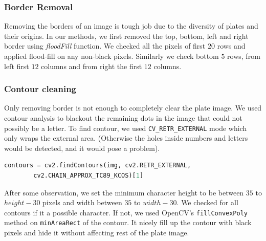 \documentclass{standalone}
\begin{document}
\subsubsection{Border Removal}
Removing the borders of an image is tough job due to the diversity of plates and their origins. In our methods, we first removed the top, bottom, left and right border using {\it floodFill} function. We checked all the pixels of first $20$ rows and applied flood-fill on any non-black pixels. Similarly we check bottom $5$ rows, from left first $12$ columns and from right the first $12$ columns.

\subsubsection{Contour cleaning}
Only removing border is not enough to completely clear the plate image. We used contour analysis to blackout the remaining dots in the image that could not possibly be a letter.
To find contour, we used \texttt{CV\_RETR\_EXTERNAL} mode which only wraps the external area. (Otherwise the holes inside numbers and letters would be detected, and it would pose a problem).
\begin{lstlisting}[language=Python]
    contours = cv2.findContours(img, cv2.RETR_EXTERNAL,
        cv2.CHAIN_APPROX_TC89_KCOS)[1]
\end{lstlisting}

After some observation, we set the minimum character height to be between $35$ to $height-30$ pixels and width between $35$ to $width-30$. We checked for all contours if it a possible character. If not, we used OpenCV's \texttt{fillConvexPoly} method on \texttt{minAreaRect} of the contour. It nicely fill up the contour with black pixels and hide it without affecting rest of the plate image.
\end{document}
